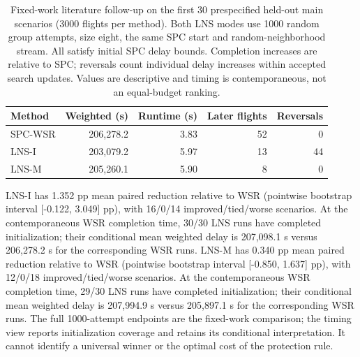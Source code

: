 \begin{table}[!htbp]
\caption{Fixed-work literature follow-up on the first 30 prespecified held-out main scenarios (3000 flights per method). Both LNS modes use 1000 random group attempts, size eight, the same SPC start and random-neighborhood stream. All satisfy initial SPC delay bounds. Completion increases are relative to SPC; reversals count individual delay increases within accepted search updates. Values are descriptive and timing is contemporaneous, not an equal-budget ranking.}\label{tab:confirmation-lns}
\centering\small
\begin{tabularx}{\textwidth}{L R R R R}
\toprule
Method & Weighted (s) & Runtime (s) & Later flights & Reversals \\
\midrule
SPC-WSR & 206,278.2 & 3.83 & 52 & 0 \\
LNS-I & 203,079.2 & 5.97 & 13 & 44 \\
LNS-M & 205,260.1 & 5.90 & 8 & 0 \\
\bottomrule
\end{tabularx}
\end{table}
LNS-I has 1.352 pp mean paired reduction relative to WSR (pointwise bootstrap interval [-0.122, 3.049] pp), with 16/0/14 improved/tied/worse scenarios. At the contemporaneous WSR completion time, 30/30 LNS runs have completed initialization; their conditional mean weighted delay is 207,098.1 s versus 206,278.2 s for the corresponding WSR runs. LNS-M has 0.340 pp mean paired reduction relative to WSR (pointwise bootstrap interval [-0.850, 1.637] pp), with 12/0/18 improved/tied/worse scenarios. At the contemporaneous WSR completion time, 29/30 LNS runs have completed initialization; their conditional mean weighted delay is 207,994.9 s versus 205,897.1 s for the corresponding WSR runs. The full 1000-attempt endpoints are the fixed-work comparison; the timing view reports initialization coverage and retains its conditional interpretation. It cannot identify a universal winner or the optimal cost of the protection rule.
